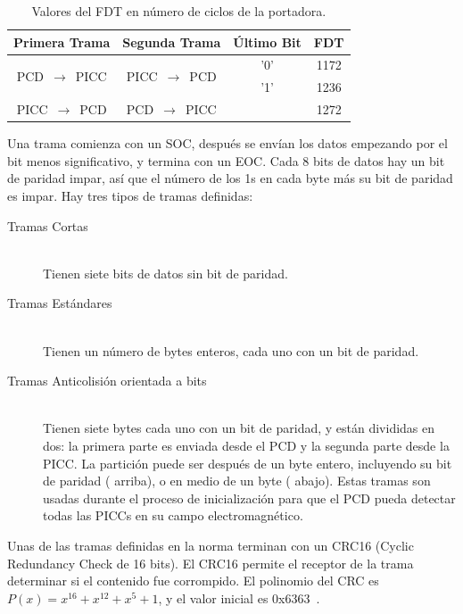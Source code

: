 \documentclass[a4paper, twoside, 11pt]{report}
\begin{document}
\begin{table}[htb]
  \centering
  \begin{tabular}{|c|c|c|c|}
    \hline
    \textbf{Primera Trama} & \textbf{Segunda Trama} & \textbf{Último Bit} & \textbf{FDT} \\
    \hline
    \multirow{2}{*}{PCD~$\rightarrow$~PICC} & \multirow{2}{*}{PICC~$\rightarrow$~PCD} & '0' & 1172  \\
    \cline{3-4}
    & & '1' & 1236 \\
    \hline
    PICC~$\rightarrow$~PCD & PCD~$\rightarrow$~PICC & & 1272 \\
    \hline
  \end{tabular}
  \caption{Valores del FDT en número de ciclos de la portadora.}
  \label{tab:fdt}
\end{table}

Una trama comienza con un SOC, después se envían los datos empezando por el bit menos significativo, y termina con un EOC. Cada 8 bits de datos hay un bit de paridad impar, así que el número de los 1s en cada byte más su bit de paridad es impar. Hay tres tipos de tramas definidas:

\begin{description}
  \item [Tramas Cortas] \hfill \\ Tienen siete bits de datos sin bit de paridad.
  \item[Tramas Estándares] \hfill \\ Tienen un número de bytes enteros, cada uno con un bit de paridad.
  \item[Tramas Anticolisión orientada a bits] \hfill \\ Tienen siete bytes cada uno con un bit de paridad, y están divididas en dos: la primera parte es enviada desde el PCD y la segunda parte desde la PICC. La partición puede ser después de un byte entero, incluyendo su bit de paridad ( arriba), o en medio de un byte ( abajo). Estas tramas son usadas durante el proceso de inicialización para que el PCD pueda detectar todas las PICCs en su campo electromagnético.
\end{description}

Unas de las tramas definidas en la norma terminan con un CRC16 (Cyclic Redundancy Check de 16 bits). El CRC16 permite el receptor de la trama determinar si el contenido fue corrompido. El polinomio del CRC es $P\left(x\right) = x^{16} + x^{12} + x^{5} + 1$, y el valor inicial es 0x6363~\cite{iso14443-3}\cite{iso13239}.
\end{document}
